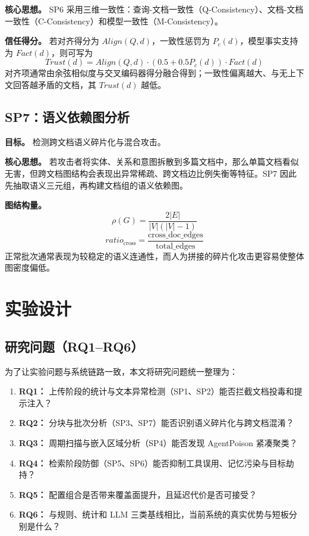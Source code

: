 \documentclass[11pt,a4paper]{ctexart}
\begin{document}
\textbf{核心思想。} SP6 采用三维一致性：查询-文档一致性（Q-Consistency）、文档-文档一致性（C-Consistency）和模型一致性（M-Consistency）。

\textbf{信任得分。} 若对齐得分为 $Align(Q,d)$，一致性惩罚为 $P_c(d)$，模型事实支持为 $Fact(d)$，则可写为
\begin{equation}
Trust(d)=Align(Q,d)\cdot\left(0.5+0.5P_c(d)\right)\cdot Fact(d)
\end{equation}
对齐项通常由余弦相似度与交叉编码器得分融合得到；一致性偏离越大、与无上下文回答越矛盾的文档，其 $Trust(d)$ 越低。

\subsection{SP7：语义依赖图分析}
\textbf{目标。} 检测跨文档语义碎片化与混合攻击。

\textbf{核心思想。} 若攻击者将实体、关系和意图拆散到多篇文档中，那么单篇文档看似无害，但跨文档图结构会表现出异常稀疏、跨文档边比例失衡等特征。SP7 因此先抽取语义三元组，再构建文档组的语义依赖图。

\textbf{图结构量。}
\begin{equation}
\rho(G)=\frac{2|E|}{|V|(|V|-1)}
\end{equation}
\begin{equation}
ratio_{\text{cross}}=\frac{\text{cross\_doc\_edges}}{\text{total\_edges}}
\end{equation}
正常批次通常表现为较稳定的语义连通性，而人为拼接的碎片化攻击更容易使整体图密度偏低。

\section{实验设计}

\subsection{研究问题（RQ1--RQ6）}
为了让实验问题与系统链路一致，本文将研究问题统一整理为：
\begin{enumerate}[leftmargin=2em]
  \item \textbf{RQ1：} 上传阶段的统计与文本异常检测（SP1、SP2）能否拦截文档投毒和提示注入？
  \item \textbf{RQ2：} 分块与批次分析（SP3、SP7）能否识别语义碎片化与跨文档混淆？
  \item \textbf{RQ3：} 周期扫描与嵌入区域分析（SP4）能否发现 AgentPoison 紧凑聚类？
  \item \textbf{RQ4：} 检索阶段防御（SP5、SP6）能否抑制工具误用、记忆污染与目标劫持？
  \item \textbf{RQ5：} 配置组合是否带来覆盖面提升，且延迟代价是否可接受？
  \item \textbf{RQ6：} 与规则、统计和 LLM 三类基线相比，当前系统的真实优势与短板分别是什么？
\end{enumerate}
\end{document}
